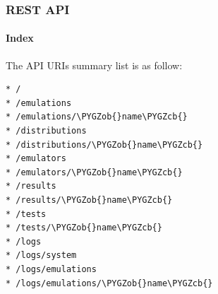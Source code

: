 \documentclass[letterpaper,10pt,english]{sphinxhowto}
\def\PYGZob{\char`\{}
\def\PYGZcb{\char`\}}
\begin{document}
\subsubsection{REST API}
\label{COCOMA/02_how_to_use_it:rest-api}

\paragraph{Index}
\label{COCOMA/02_how_to_use_it:index}
The API URIs summary list is as follow:

\begin{Verbatim}[commandchars=\\\{\}]
* /
* /emulations
* /emulations/\PYGZob{}name\PYGZcb{}
* /distributions
* /distributions/\PYGZob{}name\PYGZcb{}
* /emulators
* /emulators/\PYGZob{}name\PYGZcb{}
* /results
* /results/\PYGZob{}name\PYGZcb{}
* /tests
* /tests/\PYGZob{}name\PYGZcb{}
* /logs
* /logs/system
* /logs/emulations
* /logs/emulations/\PYGZob{}name\PYGZcb{}
\end{Verbatim}
\end{document}
